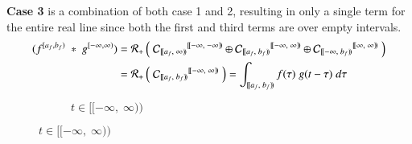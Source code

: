 \pagebreak
\textbf{Case 3} is a combination of both case 1 and 2, resulting in only a single term for the entire real line since
both the first and third terms are over empty intervals.
\begin{align*}
	(f^{[a_f,b_f)} \;*\; g^{[-\infty, \infty)})
	= \R[+] &\left( \; 
			{\C[ [\![a_f,\;\infty)\!) ]}^{[\![-\infty,\; -\infty)\!)} \oplus
			{\C[ [\![a_f,\;b_f)\!) ]}^{[\![-\infty,\; \infty)\!)} \oplus
			{\C[ [\![-\infty,\;b_f)\!) ]}^{[\![\infty,\; \infty)\!)} 
		\; \right) \\
	= \R[+] &\left( \; 
			{\C[ [\![a_f,\;b_f)\!) ]}^{[\![-\infty,\; \infty)\!)} 
		\;\right) 
		=\int_{[\![a_f,\;b_f)\!)} f(\tau) \; g(t-\tau) \; d\tau
\end{align*}
\vspace{-1.5cm}
\begin{figure}[h]
	\centering
	\begin{subfigure}[h]{0.4\textwidth}
		\caption{$t \in [\![-\infty, \; \infty)\!)$} 
		\centering
	\end{subfigure}
\end{figure}


